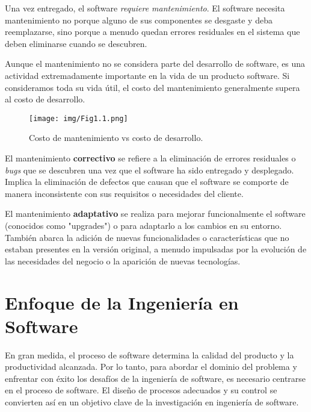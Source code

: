 Una vez entregado, el software \textit{requiere mantenimiento}. El software necesita mantenimiento no porque alguno de sus componentes se desgaste y deba reemplazarse, sino porque a menudo quedan errores residuales en el sistema que deben eliminarse cuando se descubren.

Aunque el mantenimiento no se considera parte del desarrollo de software, es una actividad extremadamente importante en la vida de un producto software. Si consideramos toda su vida útil, el costo del mantenimiento generalmente supera al costo de desarrollo.

\begin{figure}[h]
    \centering
    \texttt{[image: img/Fig1.1.png]}
    \caption{Costo de mantenimiento vs costo de desarrollo.}
    \label{fig:maint}
\end{figure}

\begin{mydef}{}{}
    El mantenimiento \textbf{correctivo} se refiere a la eliminación de errores residuales o \textit{bugs} que se descubren una vez que el software ha sido entregado y desplegado. Implica la eliminación de defectos que causan que el software se comporte de manera inconsistente con sus requisitos o necesidades del cliente.
\end{mydef}

\begin{mydef}{}{}
    El mantenimiento \textbf{adaptativo} se realiza para mejorar funcionalmente el software (conocidos como "upgrades") o para adaptarlo a los cambios en su entorno. También abarca la adición de nuevas funcionalidades o características que no estaban presentes en la versión original, a menudo impulsadas por la evolución de las necesidades del negocio o la aparición de nuevas tecnologías.
\end{mydef}


\section{Enfoque de la Ingeniería en Software}

En gran medida, el proceso de software determina la calidad del producto y la productividad alcanzada. Por lo tanto, para abordar el dominio del problema y enfrentar con éxito los desafíos de la ingeniería de software, es necesario centrarse en el proceso de software. El diseño de procesos adecuados y su control se convierten así en un objetivo clave de la investigación en ingeniería de software.

